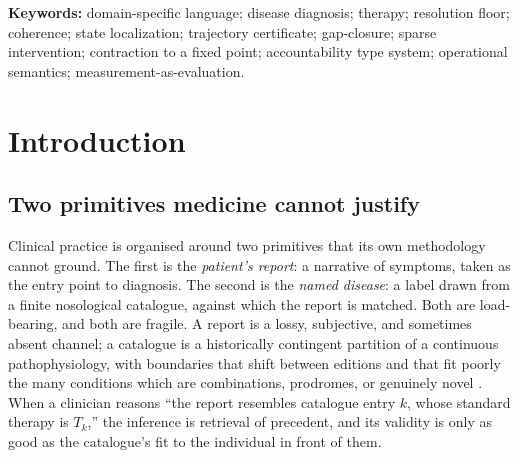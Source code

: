 \documentclass[11pt,a4paper]{article}
\theoremstyle{cfcthm}
\theoremstyle{definition}
\theoremstyle{remark}
\newcommand{\cf}[1]{\texttt{#1}}
\begin{document}
\begin{abstract}
the loop halts precisely when the state is both coherent and rigidly known
(\emph{Wellness Theorem}). We give \cf{cfc}'s complete lexical grammar,
context-free grammar in EBNF, an \emph{accountability} type system in which no
value of zero residue is well-typed and no \cf{close} converges without a
localized cell, a small-step operational semantics in which evaluation is
measurement---mutating a monotone committed-measurement clock rather than
simulating---and proofs of type soundness (progress and preservation),
determinism, and scheduler soundness (a closed cell is never re-probed and a
convergent therapy is never starved). We specify complexity, a constructive
validation protocol requiring no clinical data, and a reference execution
model. The result is a deterministic, disease-free, report-free calculus in
which a patient's state is read from a self-certifying physiological program,
the therapeutic target is a measured gap, and clinical judgment is relocated
from precedent-retrieval to the specification of \emph{intent} over a derived,
explorable state.
\end{abstract}

\noindent\textbf{Keywords:} domain-specific language; disease diagnosis;
therapy; resolution floor; coherence; state localization; trajectory
certificate; gap-closure; sparse intervention; contraction to a fixed point;
accountability type system; operational semantics; measurement-as-evaluation.

\tableofcontents

\section{Introduction}
\label{sec:intro}

\subsection{Two primitives medicine cannot justify}

Clinical practice is organised around two primitives that its own
methodology cannot ground. The first is the \emph{patient's report}: a
narrative of symptoms, taken as the entry point to diagnosis. The second is
the \emph{named disease}: a label drawn from a finite nosological catalogue,
against which the report is matched. Both are load-bearing, and both are
fragile. A report is a lossy, subjective, and sometimes absent channel; a
catalogue is a historically contingent partition of a continuous
pathophysiology, with boundaries that shift between editions and that fit
poorly the many conditions which are combinations, prodromes, or genuinely
novel \citep{feinstein1967clinical,scheuermann2009toward,loscalzo2007network}.
When a clinician reasons ``the report resembles catalogue entry $k$, whose
standard therapy is $T_k$,'' the inference is retrieval of precedent, and its
validity is only as good as the catalogue's fit to the individual in front of
them.
\end{document}
